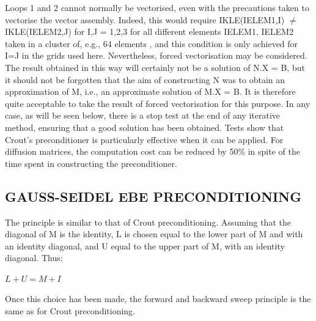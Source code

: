 Loops 1 and 2 cannot normally be vectorised, even with the precautions taken to
vectorise the vector assembly. Indeed, this would require IKLE(IELEM1,I)
$\mathrm{\neq}$ IKLE(IELEM2,J) for I,J = 1,2,3 for all different elements
IELEM1, IELEM2 taken in a cluster of, e.g., 64 elements , and this condition is
only achieved for I=J in the grids used here. Nevertheless, forced
vectorisation may be considered. The result obtained in this way will certainly
not be a solution of N.X = B, but it should not be forgotten that the aim of
constructing N was to obtain an approximation of M, i.e., an approximate
solution of M.X = B. It is therefore quite acceptable to take the result of
forced vectorisation for this purpose. In any case, as will be seen below,
there is a stop test at the end of any iterative method, ensuring that a good
solution has been obtained. Tests show that Crout's preconditioner is
particularly effective when it can be applied. For diffusion matrices, the
computation cost can be reduced by 50\% in spite of the time spent in
constructing the preconditioner.

\subsection{GAUSS-SEIDEL EBE PRECONDITIONING}

The principle is similar to that of Crout preconditioning. Assuming that the
diagonal of M is the identity, L is chosen equal to the lower part of M and
with an identity diagonal, and U equal to the upper part of M, with an identity
diagonal. Thus:

$L + U = M + I$

Once this choice has been made, the forward and backward sweep principle is the
same as for Crout preconditioning.

